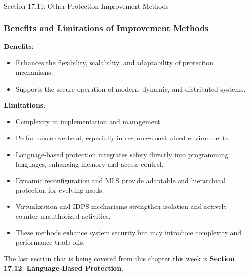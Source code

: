 \begin{notes}{Section 17.11: Other Protection Improvement Methods}
    \subsubsection*{Benefits and Limitations of Improvement Methods}
    
    \textbf{Benefits}:
    \begin{itemize}
        \item Enhances the flexibility, scalability, and adaptability of protection mechanisms.
        \item Supports the secure operation of modern, dynamic, and distributed systems.
    \end{itemize}
    
    \textbf{Limitations}:
    \begin{itemize}
        \item Complexity in implementation and management.
        \item Performance overhead, especially in resource-constrained environments.
    \end{itemize}
    
    \begin{highlight}
        \begin{itemize}
            \item Language-based protection integrates safety directly into programming languages, enhancing memory and access control.
            \item Dynamic reconfiguration and MLS provide adaptable and hierarchical protection for evolving needs.
            \item Virtualization and IDPS mechanisms strengthen isolation and actively counter unauthorized activities.
            \item These methods enhance system security but may introduce complexity and performance trade-offs.
        \end{itemize}
    \end{highlight}
\end{notes}

The last section that is being covered from this chapter this week is \textbf{Section 17.12: Language-Based Protection}.


